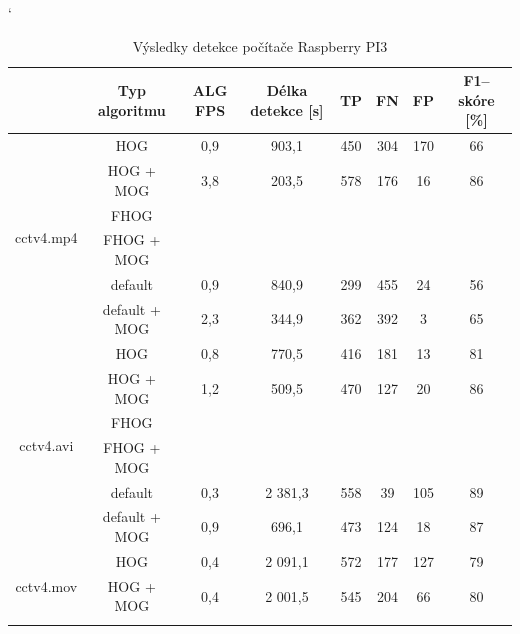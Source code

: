 \begin{table}[H]
\catcode`
\centering
\caption{Výsledky detekce počítače Raspberry PI3}
\label{resultTabRPI3}
\begin{tabular}{|c|c|c|c|c|c|c|c|}
\hline
                         & Typ algoritmu 	& ALG FPS & Délka detekce [s] & TP 		& FN 	& FP 	& F1--skóre [\%]  \\ \hline
\multirow{6}{*}{cctv4.mp4} & HOG         	&   0,9   &   903,1       	  & 450   	& 304     & 170     &    66           \\ \cline{2-8} 
                         & HOG + MOG  		&   3,8   &   203,5       	  & 578		& 176  	& 16   	& 	86	        \\ \cline{2-8} 
                         & FHOG       		&         &   			  &    		&    	&    	& 		        \\ \cline{2-8} 
                         & FHOG + MOG 		&         &               	  &    		&    	&    	& 		        \\ \cline{2-8} 
                         & default	 		&   0,9   &   840,9             & 299   	& 455   	& 24    	&    56 		   \\ \cline{2-8} 
                         & default + MOG 	&   2,3   &   344,9 		  & 362   	& 392    	&  3		&    65           \\ \hline\hline 
\multirow{6}{*}{cctv4.avi} & HOG      		&   0,8   &   770,5        	  & 416   	& 181 	& 13      & 	81	        \\ \cline{2-8} 
                         & HOG + MOG  		&   1,2   &   509,5       	  & 470		& 127 	& 20   	& 	86	        \\ \cline{2-8} 
                         & FHOG       		&         &               	  &    		&    	&    	& 		        \\ \cline{2-8} 
                         & FHOG + MOG 		&         &               	  &   		&    	&    	& 		        \\ \cline{2-8} 
                         & default	 		&   0,3   &    2 381,3       	  & 558  		& 39    	& 105   	& 	89	        \\ \cline{2-8} 
                         & default + MOG 	&   0,9   &     696,1       	  & 473  		& 124   	& 18   	& 	87	        \\ \hline \hline
\multirow{6}{*}{cctv4.mov} & HOG      		&   0,4   &   2 091,1      	  & 572 	     & 177 	& 127  	& 	79	        \\ \cline{2-8} 
                         & HOG + MOG  		&   0,4   &   2 001,5      	  & 545		& 204  	& 66	     & 	80	        \\ \cline{2-8} 

\end{tabular}
\end{table}
